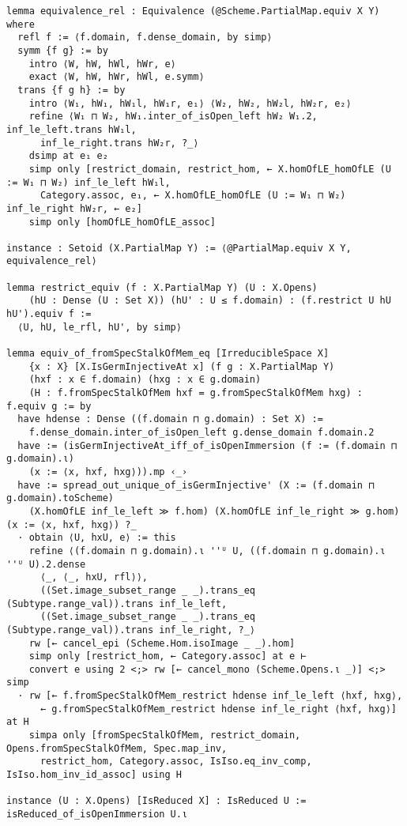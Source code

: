\documentclass{article}
\begin{document}
\begin{lstlisting}[language=Lean, caption={RationalMap.lean}]
lemma equivalence_rel : Equivalence (@Scheme.PartialMap.equiv X Y) where
  refl f := ⟨f.domain, f.dense_domain, by simp⟩
  symm {f g} := by
    intro ⟨W, hW, hWl, hWr, e⟩
    exact ⟨W, hW, hWr, hWl, e.symm⟩
  trans {f g h} := by
    intro ⟨W₁, hW₁, hW₁l, hW₁r, e₁⟩ ⟨W₂, hW₂, hW₂l, hW₂r, e₂⟩
    refine ⟨W₁ ⊓ W₂, hW₁.inter_of_isOpen_left hW₂ W₁.2, inf_le_left.trans hW₁l,
      inf_le_right.trans hW₂r, ?_⟩
    dsimp at e₁ e₂
    simp only [restrict_domain, restrict_hom, ← X.homOfLE_homOfLE (U := W₁ ⊓ W₂) inf_le_left hW₁l,
      Category.assoc, e₁, ← X.homOfLE_homOfLE (U := W₁ ⊓ W₂) inf_le_right hW₂r, ← e₂]
    simp only [homOfLE_homOfLE_assoc]

instance : Setoid (X.PartialMap Y) := ⟨@PartialMap.equiv X Y, equivalence_rel⟩

lemma restrict_equiv (f : X.PartialMap Y) (U : X.Opens)
    (hU : Dense (U : Set X)) (hU' : U ≤ f.domain) : (f.restrict U hU hU').equiv f :=
  ⟨U, hU, le_rfl, hU', by simp⟩

lemma equiv_of_fromSpecStalkOfMem_eq [IrreducibleSpace X]
    {x : X} [X.IsGermInjectiveAt x] (f g : X.PartialMap Y)
    (hxf : x ∈ f.domain) (hxg : x ∈ g.domain)
    (H : f.fromSpecStalkOfMem hxf = g.fromSpecStalkOfMem hxg) : f.equiv g := by
  have hdense : Dense ((f.domain ⊓ g.domain) : Set X) :=
    f.dense_domain.inter_of_isOpen_left g.dense_domain f.domain.2
  have := (isGermInjectiveAt_iff_of_isOpenImmersion (f := (f.domain ⊓ g.domain).ι)
    (x := ⟨x, hxf, hxg⟩)).mp ‹_›
  have := spread_out_unique_of_isGermInjective' (X := (f.domain ⊓ g.domain).toScheme)
    (X.homOfLE inf_le_left ≫ f.hom) (X.homOfLE inf_le_right ≫ g.hom) (x := ⟨x, hxf, hxg⟩) ?_
  · obtain ⟨U, hxU, e⟩ := this
    refine ⟨(f.domain ⊓ g.domain).ι ''ᵁ U, ((f.domain ⊓ g.domain).ι ''ᵁ U).2.dense
      ⟨_, ⟨_, hxU, rfl⟩⟩,
      ((Set.image_subset_range _ _).trans_eq (Subtype.range_val)).trans inf_le_left,
      ((Set.image_subset_range _ _).trans_eq (Subtype.range_val)).trans inf_le_right, ?_⟩
    rw [← cancel_epi (Scheme.Hom.isoImage _ _).hom]
    simp only [restrict_hom, ← Category.assoc] at e ⊢
    convert e using 2 <;> rw [← cancel_mono (Scheme.Opens.ι _)] <;> simp
  · rw [← f.fromSpecStalkOfMem_restrict hdense inf_le_left ⟨hxf, hxg⟩,
      ← g.fromSpecStalkOfMem_restrict hdense inf_le_right ⟨hxf, hxg⟩] at H
    simpa only [fromSpecStalkOfMem, restrict_domain, Opens.fromSpecStalkOfMem, Spec.map_inv,
      restrict_hom, Category.assoc, IsIso.eq_inv_comp, IsIso.hom_inv_id_assoc] using H

instance (U : X.Opens) [IsReduced X] : IsReduced U := isReduced_of_isOpenImmersion U.ι


\end{lstlisting}
\end{document}
